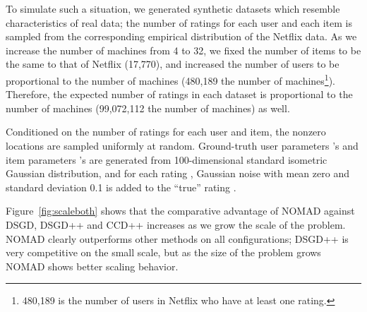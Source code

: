 \documentclass{vldb}
\begin{document}
To simulate such a situation, we generated synthetic datasets which
resemble characteristics of real data; the number of ratings for each
user and each item is sampled from the corresponding empirical
distribution of the Netflix data.  As we increase the number of machines
from 4 to 32, we fixed the number of items to be the same to that of
Netflix (17,770), and increased the number of users to be proportional
to the number of machines (480,189  the number of
machines\footnote{480,189 is the number of users in Netflix who have at
  least one rating. }).  Therefore, the expected number of ratings in
each dataset is proportional to the number of machines (99,072,112
 the number of machines) as well.

Conditioned on the number of ratings for each user and item, the
nonzero locations are sampled uniformly at random.  Ground-truth user
parameters 's and item parameters 's are generated from
100-dimensional standard isometric Gaussian distribution, and for each
rating , Gaussian noise with mean zero and standard deviation
0.1 is added to the ``true'' rating .

Figure~\ref{fig:scaleboth} shows that the comparative advantage of
NOMAD against DSGD, DSGD++ and CCD++ increases as we grow the scale of
the problem.  NOMAD clearly outperforms other methods on all
configurations; DSGD++ is very competitive on the small scale, but as
the size of the problem grows NOMAD shows better scaling behavior.
\end{document}
